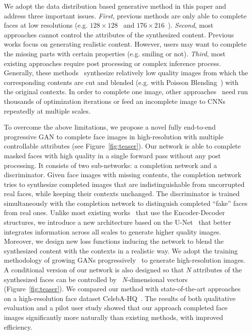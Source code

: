 \documentclass[acmtog,timestamp]{acmart}
\begin{document}
We adopt the data distribution based generative method in this paper and address three important issues. \textit{First}, previous methods are only able to complete faces at low resolutions (e.g. $128\times128$~\cite{li2017generative} and $176\times216$~\cite{iizuka2017globally}). \textit{Second}, most approaches cannot control the attributes of the synthesized content. Previous works focus on generating realistic content. However, users may want to complete the missing parts with certain properties (e.g. smiling or not). \textit{Third}, most existing approaches require post processing or complex inference process. Generally, these methods~\cite{iizuka2017globally,li2017generative,yeh2017semantic} synthesize relatively low quality images from which the corresponding contents are cut and blended (e.g. with Poisson Blending~\cite{perez2003poisson}) with the original contexts. In order to complete one image, other approaches~\cite{yeh2017semantic,yang2016high} need run thousands of optimization iterations or feed an incomplete image to CNNs repeatedly at multiple scales. 

To overcome the above limitations, we propose a novel fully end-to-end progressive GAN to complete face images in high-resolution with multiple controllable attributes (see Figure~\ref{fig:teaser}). Our network is able to complete masked faces with high quality in a single forward pass without any post processing. It consists of two sub-networks: a completion network and a discriminator. Given face images with missing contents, the completion network tries to synthesize completed images that are indistinguishable from uncorrupted real faces, while keeping their contexts unchanged. The discriminator is trained simultaneously with the completion network to distinguish completed ``fake'' faces from real ones. Unlike most existing works~\cite{li2017generative,iizuka2017globally,yang2016high,denton2016semi} that use the Encoder-Decoder structures, we introduce a new architecture based on the U-Net~\cite{ronneberger2015u} that better integrates information across all scales to generate higher quality images. Moreover, we design new loss functions inducing the network to blend the synthesized content with the contexts in a realistic way. We adopt the training methodology of growing GANs progressively~\cite{karras2017progressive} to generate high-resolution images. A conditional version of our network is also designed so that \textit{N} attributes of the synthesized faces can be controlled by ~\textit{N}-dimensional vectors (Figure~\ref{fig:teaser}). We compared our method with state-of-the-art approaches on a high-resolution face dataset CelebA-HQ~\cite{karras2017progressive}. The results of both qualitative evaluation and a pilot user study showed that our approach completed face images significantly more naturally than existing methods, with improved efficiency.
\end{document}
